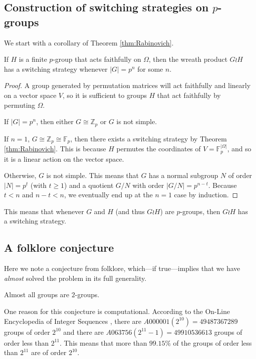 \subsection{Construction of switching strategies on \texorpdfstring{$p$}{p}-groups}
We start with a corollary of Theorem \ref{thm:Rabinovich}.
\begin{corollary}
  If $H$ is a finite $p$-group that acts faithfully on $\Omega$,
  then the wreath product
  $G \wr H$ has a switching strategy whenever $|G| = p^n$ for some $n$.
\end{corollary}
\begin{proof}
  A group generated by permutation matrices will act faithfully and linearly on
  a vector space $V$, so it is sufficient to groups $H$ that act faithfully
  by permuting $\Omega$.

  If $|G| = p^n$, then either $G \cong \mathbb{Z}_p$ or $G$ is not simple.

  If $n = 1$, $G \cong \mathbb{Z}_p \cong \mathbb F_p$, then there exists a
  switching strategy by Theorem \ref{thm:Rabinovich}. This is because $H$
  permutes the coordinates of $V = \mathbb F_p^{|\Omega|}$, and so it is a
  linear action on the vector space.

  Otherwise, $G$ is not simple. This means that $G$ has a normal subgroup $N$
  of order $|N| = p^t$ (with $t \geq 1$) and a quotient $G/N$ with order $|G/N| = p^{n-t}$.
  Because $t < n$ and $n - t < n$, we eventually end up at the $n=1$ case by
  induction.
\end{proof}

This means that whenever $G$ and $H$ (and thus $G \wr H$) are $p$-groups,
then $G \wr H$ has a switching strategy.

\subsection{A folklore conjecture}
Here we note a conjecture from folklore, which---if true---implies that we have
\textit{almost} solved the problem in its full generality.
\begin{conjecture}[Folklore]
  Almost all groups are $2$-groups.
\end{conjecture}

One reason for this conjecture is computational. According to the
On-Line Encyclopedia of Integer Sequences \cite{oeis},
there are $A000001(2^{10}) = 49487367289$ groups of order $2^{10}$ and there are
$A063756(2^{11}-1) = 49910536613$ groups of order less than $2^{11}$.
This means that more than $99.15\%$ of the groups of order less than $2^{11}$
are of order $2^{10}$.


